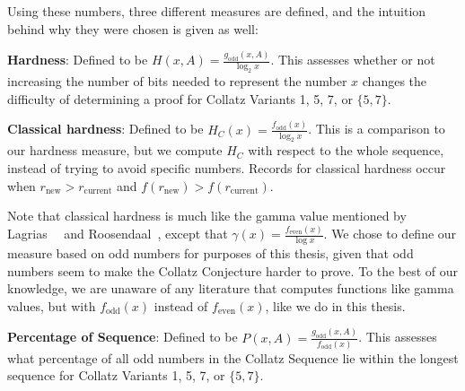 Using these numbers, three different measures are defined, and the intuition behind why they were chosen is given as well: \par
\textbf{Hardness}: Defined to be $H(x,A) = \frac{g_\text{odd}(x,A)}{\log_2{x}}$. This assesses whether or not increasing the number of bits needed to represent the number $x$ changes the difficulty of determining a proof for Collatz Variants  1, 5, 7, or $\{5,7\}$.  \par
\textbf{Classical hardness}: Defined to be $H_C(x) = \frac{f_\text{odd}(x)}{\log_2{x}}$. This is a comparison to our hardness measure, but we compute $H_C$ with respect to the whole sequence, instead of trying to avoid specific numbers. Records for classical hardness occur when $r_\text{new} > r_\text{current}$ and $f(r_\text{new}) > f(r_\text{current})$. \par
Note that classical hardness is much like the gamma value mentioned by Lagrias~\cite{2003mathLagrais}~\cite{2006mathLagrias} and Roosendaal~\cite{EricRoose}, except that $\gamma(x) = \frac{f_\text{even}(x)}{\log{x}}$. We chose to define our measure based on odd numbers for purposes of this thesis, given that odd numbers seem to make the Collatz Conjecture harder to prove. To the best of our knowledge, we are unaware of any literature that computes functions like gamma values, but with $f_\text{odd}(x)$ instead of $f_\text{even}(x)$, like we do in this thesis.\par
\textbf{Percentage of Sequence}: Defined to be $P(x,A) = \frac{g_\text{odd}(x,A)}{f_\text{odd}(x)}$. This assesses what percentage of all odd numbers in the Collatz Sequence lie within the longest sequence for Collatz Variants 1, 5, 7, or $\{5,7\}$.

